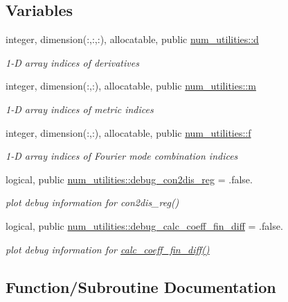 \subsection*{Variables}
\begin{DoxyCompactItemize}
\item 
integer, dimension(\+:,\+:,\+:), allocatable, public \hyperlink{namespacenum__utilities_a763215553acfcc054b1ec1bc207a1793}{num\+\_\+utilities\+::d}
\begin{DoxyCompactList}\small\item\em 1-\/D array indices of derivatives \end{DoxyCompactList}\item 
integer, dimension(\+:,\+:), allocatable, public \hyperlink{namespacenum__utilities_ad7a7ae2abf02a2df9e00b2aca669617c}{num\+\_\+utilities\+::m}
\begin{DoxyCompactList}\small\item\em 1-\/D array indices of metric indices \end{DoxyCompactList}\item 
integer, dimension(\+:,\+:), allocatable, public \hyperlink{namespacenum__utilities_a8e3399292fcb3a5fc35ae87f7811bbb5}{num\+\_\+utilities\+::f}
\begin{DoxyCompactList}\small\item\em 1-\/D array indices of Fourier mode combination indices \end{DoxyCompactList}\item 
logical, public \hyperlink{namespacenum__utilities_ab7138a230a3c494c7a2b71b2a7fffc0a}{num\+\_\+utilities\+::debug\+\_\+con2dis\+\_\+reg} = .false.
\begin{DoxyCompactList}\small\item\em plot debug information for con2dis\+\_\+reg() \end{DoxyCompactList}\item 
logical, public \hyperlink{namespacenum__utilities_ae20985c8049d39f987fa23d728688cbc}{num\+\_\+utilities\+::debug\+\_\+calc\+\_\+coeff\+\_\+fin\+\_\+diff} = .false.
\begin{DoxyCompactList}\small\item\em plot debug information for \hyperlink{namespacenum__utilities_a4dffe3beba7165dd17cff19a99a9e2ac}{calc\+\_\+coeff\+\_\+fin\+\_\+diff()} \end{DoxyCompactList}\end{DoxyCompactItemize}


\subsection{Function/\+Subroutine Documentation}
\mbox{\label{num__utilities_8f90_a41f0ec23e08348e7498587997f483a00}} 
